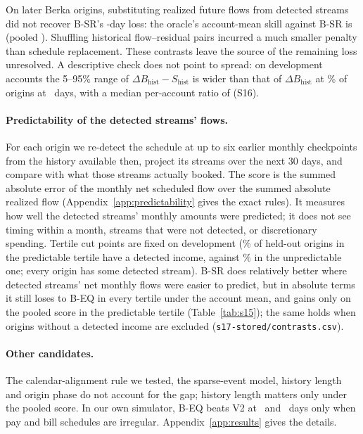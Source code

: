 On later Berka origins, substituting realized future flows from detected
streams did not recover B-SR's \hC-day loss: the oracle's account-mean
skill against B-SR is 
(pooled ). Shuffling historical
flow--residual pairs incurred a much smaller penalty than schedule
replacement. These contrasts leave the source of the remaining loss
unresolved. A descriptive check does not point to spread: on development
accounts the 5--95\% range of $\Delta B_{\text{hist}} - S_{\text{hist}}$
is wider than that of $\Delta B_{\text{hist}}$ at
\% of origins at \hC\ days, with a median
per-account ratio of  (S16).

\paragraph{Predictability of the detected streams' flows.} For each origin we
re-detect the schedule at up to six earlier monthly checkpoints from the
history available then, project its streams over the next 30 days, and
compare with what those streams actually booked. The score is the summed
absolute error of the monthly net scheduled flow over the summed absolute
realized flow (Appendix~\ref{app:predictability} gives the exact rules). It
measures how well the detected streams' monthly amounts were predicted;
it does not see timing within a month, streams that were not detected, or
discretionary spending. Tertile cut points are fixed on development
(\% of held-out origins in
the predictable tertile have a detected income, against
\% in the unpredictable
one; every origin has some detected stream). B-SR does relatively better
where detected streams' net monthly flows were easier to predict, but in absolute terms it still loses to
B-EQ in every tertile under the account mean, and gains only on the pooled
score in the predictable tertile (Table~\ref{tab:s15}); the same holds when
origins without a detected income are excluded
(\texttt{s17-stored/contrasts.csv}).

\paragraph{Other candidates.} The calendar-alignment rule we tested, the
sparse-event model, history length and origin phase do not account for the
gap; history length matters only under the pooled score. In our own
simulator, B-EQ beats V2 at \hB\ and \hC\ days only when pay and bill
schedules are irregular. Appendix~\ref{app:results} gives the details.
